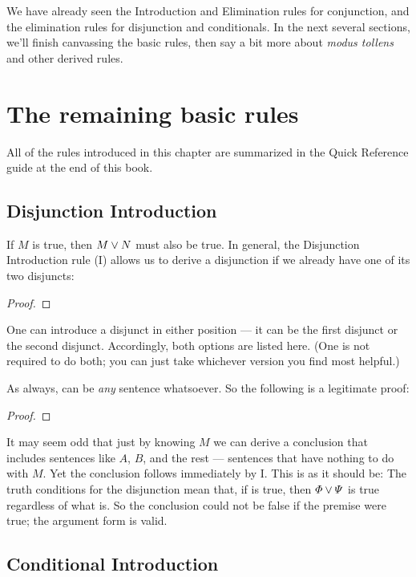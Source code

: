 We have already seen the Introduction and Elimination rules for conjunction, and the elimination rules for disjunction and conditionals. In the next several sections, we'll finish canvassing the basic rules, then say a bit more about \emph{modus tollens} and other derived rules.

\section{The remaining basic rules}

All of the rules introduced in this chapter are summarized in the Quick Reference guide at the end of this book.

\subsection{Disjunction Introduction}
If $M$ is true, then $M \vee N$ must also be true. In general, the Disjunction Introduction rule ({\eor}I) allows us to derive a disjunction if we already have one of its two disjuncts:

\begin{proof}
	\metaA{}
\end{proof}

One can introduce a disjunct in either position --- it can be the first disjunct or the second disjunct. Accordingly, both options are listed here. (One is not required to do both; you can just take whichever version you find most helpful.)

As always, \metaB{} can be \emph{any} sentence whatsoever. So the following is a legitimate proof:

\begin{proof}
\end{proof}

It may seem odd that just by knowing $M$ we can derive a conclusion that includes sentences like $A$, $B$, and the rest --- sentences that have nothing to do with $M$. Yet the conclusion follows immediately by {\eor}I. This is as it should be: The truth conditions for the disjunction mean that, if \metaA{} is true, then $\varPhi{}\vee \varPsi{}$ is true regardless of what \metaB{} is. So the conclusion could not be false if the premise were true; the argument form is valid.

\subsection{Conditional Introduction}


